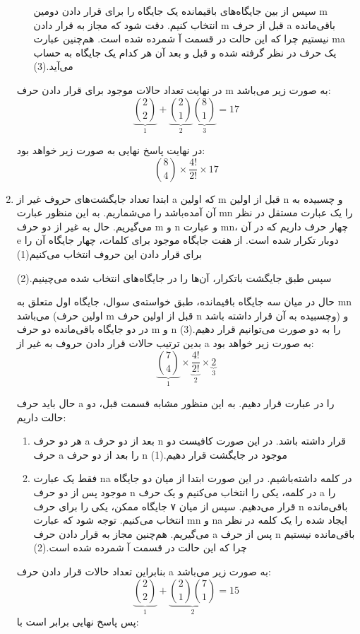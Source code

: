 \begin{enumerate}
\begin{enumerate}
      \p
      سپس از بین جایگاه‌های باقیمانده یک جایگاه را برای قرار دادن دومین m انتخاب کنیم. دقت شود که مجاز به قرار دادن m قبل از حرف a باقی‌مانده نیستیم چرا که این حالت در قسمت آ شمرده شده است. هم‌چنین عبارت ma یک حرف در نظر گرفته شده و قبل و بعد آن هر کدام یک جایگاه به حساب می‌آید.(3)
    \end{enumerate}
    \p
    در نهایت تعداد حالات موجود برای قرار دادن حرف m به صورت زیر می‌باشد:
    $$\underbrace{2\choose 2}_{1} + \underbrace{2\choose 1}_{2}\underbrace{8\choose 1}_{3} = 17$$
    
    در نهایت پاسخ نهایی به صورت زیر خواهد بود:
    $${8\choose 4} \times \frac{4!}{2!} \times 17$$
    \item
    \p
    ابتدا تعداد جایگشت‌های  حروف غیر از a که اولین m قبل از اولین n و چسبیده به آن آمده‌باشد را می‌شماریم.
    به این منظور عبارت mn را یک عبارت مستقل در نظر می‌گیریم.
    حال به غیر از دو حرف m و n و عبارت mn، 
    چهار حرف داریم که در آن e دوبار تکرار شده است.
    از هفت جایگاه موجود برای کلمات، چهار جایگاه آن را برای قرار دادن این حروف انتخاب می‌کنیم(1)
    
    \p
    سپس طبق جایگشت باتکرار، آن‌ها را در جایگاه‌های انتخاب شده می‌چینیم.(2)
    
    \p
    حال در میان سه جایگاه باقیمانده، طبق خواسته‌ی سوال، جایگاه اول متعلق به mn می‌باشد
    (اولین حرف m قبل از اولین حرف n وچسبیده به آن قرار داشته باشد)
    و در دو جایگاه باقی‌مانده دو حرف m و n را به دو صورت می‌توانیم قرار دهیم.(3)
    \p
    بدین ترتیب حالات قرار دادن حروف به غیر از a به صورت زیر خواهد بود:
    $$\underbrace{{7\choose 4}}_{1} \times \underbrace{\frac{4!}{2!}}_{2} \times \underbrace{2}_{3}$$
    
    حال باید حرف a را در عبارت قرار دهیم.
    به این منظور مشابه قسمت قبل، دو حالت داریم:
    \begin{enumerate}
      \item 
      \p
      هر دو حرف a بعد از دو حرف n قرار داشته باشد. در این صورت کافیست دو حرف a را بعد از دو حرف n موجود در جایگشت قرار دهیم.(1)
      \item
      \p
      فقط یک عبارت na در کلمه داشته‌باشیم. در این صورت ابتدا از میان دو جایگاه موجود پس از دو حرف n در کلمه، یکی را انتخاب می‌کنیم و یک حرف a را قرار می‌دهیم. سپس از میان ۷ جایگاه ممکن، یکی را برای حرف n باقی‌مانده انتخاب می‌کنیم.
      توجه شود که عبارت mn و na ایجاد شده را یک کلمه‌ در نظر می‌گیریم. هم‌چنین مجاز به قرار دادن حرف a پس از حرف n باقی‌مانده نیستیم چرا که این حالت در قسمت آ شمرده شده است.(2)
    \end{enumerate}
    \p
    بنابراین تعداد حالات قرار دادن حرف a به صورت زیر می‌باشد:
    $$\underbrace{2\choose 2}_{1} + \underbrace{{2\choose 1}{7\choose 1}}_{2} = 15$$ 
    پس پاسخ نهایی برابر است با:
    

\end{enumerate}
